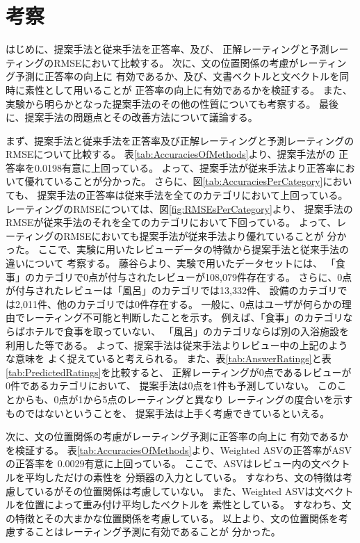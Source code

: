 \section{考察} \label{sec:Discussion}

はじめに、提案手法と従来手法を正答率、及び、
正解レーティングと予測レーティングのRMSEにおいて比較する。
次に、文の位置関係の考慮がレーティング予測に正答率の向上に
有効であるか、及び、文書ベクトルと文ベクトルを同時に素性として用いることが
正答率の向上に有効であるかを検証する。
また、実験から明らかとなった提案手法のその他の性質についても考察する。
最後に、提案手法の問題点とその改善方法について議論する。

まず、提案手法と従来手法を正答率及び正解レーティングと予測レーティングの
RMSEについて比較する。
表\ref{tab:AccuraciesOfMethods}より、提案手法が\rival の
正答率を0.0198有意に上回っている。
よって、提案手法が従来手法より正答率において優れていることが分かった。
さらに、図\ref{tab:AccuraciesPerCategory}においても、
提案手法の正答率は従来手法を全てのカテゴリにおいて上回っている。
レーティングのRMSEについては、図\ref{fig:RMSEsPerCategory}より、
提案手法のRMSEが従来手法のそれを全てのカテゴリにおいて下回っている。
よって、レーティングのRMSEにおいても提案手法が従来手法より優れていることが
分かった。
ここで、実験に用いたレビューデータの特徴から提案手法と従来手法の違いについて
考察する。
藤谷ら\cite{fujitani15}より、実験で用いたデータセットには、
「食事」のカテゴリで0点が付与されたレビューが108,079件存在する。
さらに、0点が付与されたレビューは「風呂」のカテゴリでは13,332件、
設備のカテゴリでは2,011件、他のカテゴリでは0件存在する。
一般に、0点はユーザが何らかの理由でレーティング不可能と判断したことを示す。
例えば、「食事」のカテゴリならばホテルで食事を取っていない、
「風呂」のカテゴリならば別の入浴施設を利用した等である。
よって、提案手法は従来手法よりレビュー中の上記のような意味を
よく捉えていると考えられる。
また、表\ref{tab:AnswerRatings}と表\ref{tab:PredictedRatings}を比較すると、
正解レーティングが0点であるレビューが0件であるカテゴリにおいて、
提案手法は0点を1件も予測していない。
このことからも、0点が1から5点のレーティングと異なり
レーティングの度合いを示すものではないということを、
提案手法は上手く考慮できているといえる。

次に、文の位置関係の考慮がレーティング予測に正答率の向上に
有効であるかを検証する。
表\ref{tab:AccuraciesOfMethods}より、Weighted ASVの正答率がASVの正答率を
0.0029有意に上回っている。
ここで、ASVはレビュー内の文ベクトルを平均しただけの素性を
分類器の入力としている。
すなわち、文の特徴は考慮しているがその位置関係は考慮していない。
また、Weighted ASVは文ベクトルを位置によって重み付け平均したベクトルを
素性としている。
すなわち、文の特徴とその大まかな位置関係を考慮している。
以上より、文の位置関係を考慮することはレーティング予測に有効であることが
分かった。

